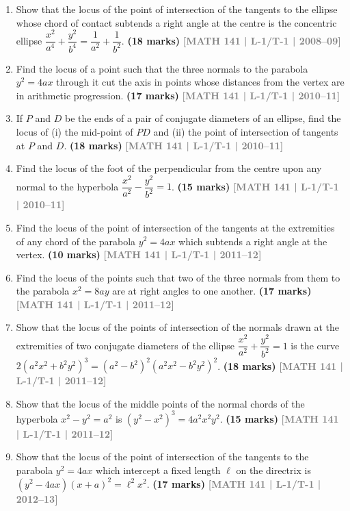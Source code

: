\documentclass[12pt,a4paper]{article}
\newcommand{\yr}[1]{\hfill\textcolor{gray}{\small\textbf{[#1]}}}
\newcommand{\mk}[1]{\textcolor{orange!70!black}{\small\textbf{(#1 marks)}}}
\begin{document}
\begin{enumerate}
\item Show that the locus of the point of intersection of the tangents to the ellipse whose chord of contact subtends a right angle at the centre is the concentric ellipse $\dfrac{x^{2}}{a^{4}}+\dfrac{y^{2}}{b^{4}}=\dfrac{1}{a^{2}}+\dfrac{1}{b^{2}}$.
\mk{18} \yr{MATH 141 | L-1/T-1 | 2008--09}

\item Find the locus of a point such that the three normals to the parabola $y^{2}=4ax$ through it cut the axis in points whose distances from the vertex are in arithmetic progression.
\mk{17} \yr{MATH 141 | L-1/T-1 | 2010--11}

\item If $P$ and $D$ be the ends of a pair of conjugate diameters of an ellipse, find the locus of (i) the mid-point of $PD$ and (ii) the point of intersection of tangents at $P$ and $D$.
\mk{18} \yr{MATH 141 | L-1/T-1 | 2010--11}

\item Find the locus of the foot of the perpendicular from the centre upon any normal to the hyperbola $\dfrac{x^{2}}{a^{2}}-\dfrac{y^{2}}{b^{2}}=1$.
\mk{15} \yr{MATH 141 | L-1/T-1 | 2010--11}

\item Find the locus of the point of intersection of the tangents at the extremities of any chord of the parabola $y^{2}=4ax$ which subtends a right angle at the vertex.
\mk{10} \yr{MATH 141 | L-1/T-1 | 2011--12}

\item Find the locus of the points such that two of the three normals from them to the parabola $x^{2}=8ay$ are at right angles to one another.
\mk{17} \yr{MATH 141 | L-1/T-1 | 2011--12}

\item Show that the locus of the points of intersection of the normals drawn at the extremities of two conjugate diameters of the ellipse $\dfrac{x^{2}}{a^{2}}+\dfrac{y^{2}}{b^{2}}=1$ is the curve $2(a^{2}x^{2}+b^{2}y^{2})^{3}=(a^{2}-b^{2})^{2}(a^{2}x^{2}-b^{2}y^{2})^{2}$.
\mk{18} \yr{MATH 141 | L-1/T-1 | 2011--12}

\item Show that the locus of the middle points of the normal chords of the hyperbola $x^{2}-y^{2}=a^{2}$ is $(y^{2}-x^{2})^{3}=4a^{2}x^{2}y^{2}$.
\mk{15} \yr{MATH 141 | L-1/T-1 | 2011--12}

\item Show that the locus of the point of intersection of the tangents to the parabola $y^{2}=4ax$ which intercept a fixed length $\ell$ on the directrix is $(y^{2}-4ax)(x+a)^{2}=\ell^{2}x^{2}$.
\mk{17} \yr{MATH 141 | L-1/T-1 | 2012--13}


\end{enumerate}
\end{document}
